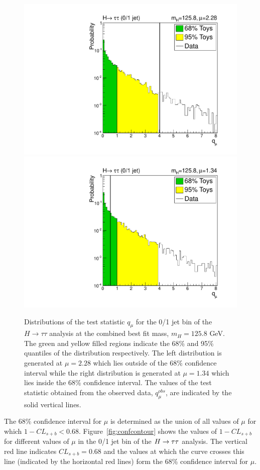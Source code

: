 \begin{figure}
\begin{center}
\includegraphics[width=.49\textwidth]{combinations/fceg_htt_2.pdf}
\includegraphics[width=.49\textwidth]{combinations/fceg_htt_1.pdf}
\caption{Distributions of the test statistic $q_{\mu}$ for the 0/1 jet bin 
of the $H\rightarrow \tau\tau$ analysis at the combined best fit mass, $m_{H} = 125.8$ GeV.
The green and yellow filled regions indicate the 68\% and 95\% quantiles of the 
distribution respectively. 
The left distribution is generated at $\mu=2.28$ 
which lies outside of the 68\% confidence interval
while the right distribution is generated at $\mu=1.34$ which lies inside the 
68\% confidence interval. The values of the test statistic obtained from the observed data, 
$q_{\mu}^{obs}$, are indicated by the solid vertical lines.}
\label{fig:fcegtoys}
\end{center}
\end{figure}
The 68\% confidence interval for $\mu$ is determined as the union of all values of $\mu$ for 
which $1-CL_{s+b}<0.68$.
Figure~\ref{fig:confcontour} shows the values of $1-CL_{s+b}$ for different values of 
$\mu$ in the 0/1 jet bin of the $H\rightarrow\tau\tau$ analysis.
The vertical red line indicates $CL_{s+b}=0.68$ and the values at which the curve
crosses this line (indicated by the horizontal red lines) form the 68\% confidence 
interval for $\mu$.
